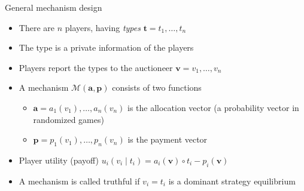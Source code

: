 \documentclass{beamer}
\begin{document}
\begin{frame}{General mechanism design}
  \begin{itemize}
    \item There are $n$ players, having \emph{types} $\mathbf{t} = t_1, \dots, t_n$
    \item The type is a private information of the players
    \item Players report the types to the auctioneer
      $\mathbf{v} = v_1, \dots, v_n$
    \item A mechanism $\mathcal{M}(\mathbf{a},\mathbf{p})$ consists of two functions
      \begin{itemize}
      \item $\mathbf{a} = a_1(v_1), \dots , a_n(v_n)$ is the
        allocation vector (a probability vector in randomized games)
      \item $\mathbf{p} = p_1(v_1), \dots , p_n(v_n)$ is the payment
        vector
      \end{itemize}
    \item Player utility (payoff) $u_i(v_i \mid t_i) = a_i(\mathbf{v}) \circ
      t_i - p_i(\mathbf{v})$
    \item A mechanism is called truthful if $v_i = t_i$ is a dominant strategy
      equilibrium
  \end{itemize}
\end{frame}
\end{document}
